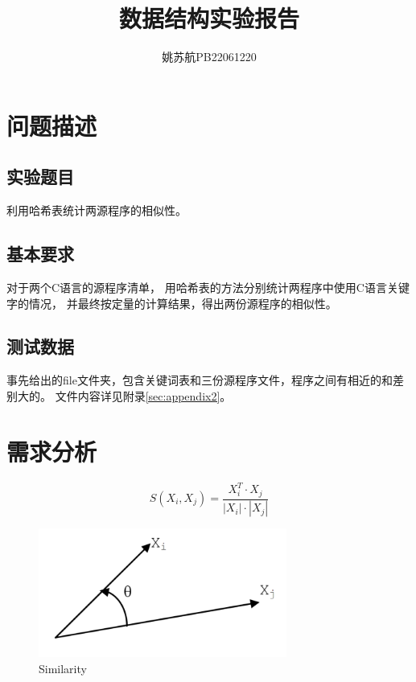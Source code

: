 \documentclass[a4paper]{article}
\title{\textbf{数据结构实验报告}}
\author{姚苏航\qquad PB22061220}
\date{}
\begin{document}
    \maketitle


    \section{问题描述}\label{sec:des}

    \subsection{实验题目}\label{subsec:q}
    {{利用哈希表统计两源程序的相似性。}}

    \subsection{基本要求}\label{subsec:req}
    {{对于两个C语言的源程序清单，
    用哈希表的方法分别统计两程序中使用C语言关键字的情况，
    并最终按定量的计算结果，得出两份源程序的相似性。}}

    \subsection{测试数据}\label{subsec:test}
    {{事先给出的file文件夹，包含关键词表和三份源程序文件，程序之间有相近的和差别大的。
    文件内容详见附录\ref{sec:appendix2}。}}


    \section{需求分析}\label{sec:need}


    \begin{equation}
        S(X_i,X_j)=\frac{X_i^T\cdot X_j}{|X_i|\cdot|X_j|}\label{eq:equation}
    \end{equation}
    \begin{figure}[htbp]
        \centering
        \includegraphics[height=120pt]{S}
        \caption{Similarity}\label{fig:S}
    \end{figure}
\end{document}
